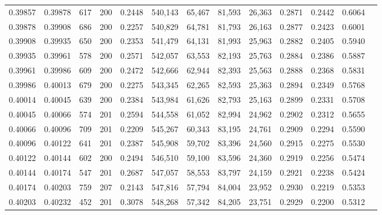 \begin{tabular}{rrrrrrrrrrrrr}
0.39857 & 0.39878 &   617 & 200 &                                     0.2448 & 540,143 &  65,467 &  81,593 &  26,363 & 0.2871 & 0.2442 & 0.6064 \\
0.39878 & 0.39908 &   686 & 200 &                                     0.2257 & 540,829 &  64,781 &  81,793 &  26,163 & 0.2877 & 0.2423 & 0.6001 \\
0.39908 & 0.39935 &   650 & 200 &                                     0.2353 & 541,479 &  64,131 &  81,993 &  25,963 & 0.2882 & 0.2405 & 0.5940 \\
0.39935 & 0.39961 &   578 & 200 &                                     0.2571 & 542,057 &  63,553 &  82,193 &  25,763 & 0.2884 & 0.2386 & 0.5887 \\
0.39961 & 0.39986 &   609 & 200 &                                     0.2472 & 542,666 &  62,944 &  82,393 &  25,563 & 0.2888 & 0.2368 & 0.5831 \\
0.39986 & 0.40013 &   679 & 200 &                                     0.2275 & 543,345 &  62,265 &  82,593 &  25,363 & 0.2894 & 0.2349 & 0.5768 \\
0.40014 & 0.40045 &   639 & 200 &                                     0.2384 & 543,984 &  61,626 &  82,793 &  25,163 & 0.2899 & 0.2331 & 0.5708 \\
0.40045 & 0.40066 &   574 & 201 &                                     0.2594 & 544,558 &  61,052 &  82,994 &  24,962 & 0.2902 & 0.2312 & 0.5655 \\
0.40066 & 0.40096 &   709 & 201 &                                     0.2209 & 545,267 &  60,343 &  83,195 &  24,761 & 0.2909 & 0.2294 & 0.5590 \\
0.40096 & 0.40122 &   641 & 201 &                                     0.2387 & 545,908 &  59,702 &  83,396 &  24,560 & 0.2915 & 0.2275 & 0.5530 \\
0.40122 & 0.40144 &   602 & 200 &                                     0.2494 & 546,510 &  59,100 &  83,596 &  24,360 & 0.2919 & 0.2256 & 0.5474 \\
0.40144 & 0.40174 &   547 & 201 &                                     0.2687 & 547,057 &  58,553 &  83,797 &  24,159 & 0.2921 & 0.2238 & 0.5424 \\
0.40174 & 0.40203 &   759 & 207 &                                     0.2143 & 547,816 &  57,794 &  84,004 &  23,952 & 0.2930 & 0.2219 & 0.5353 \\
0.40203 & 0.40232 &   452 & 201 &                                     0.3078 & 548,268 &  57,342 &  84,205 &  23,751 & 0.2929 & 0.2200 & 0.5312 \\

\end{tabular}
